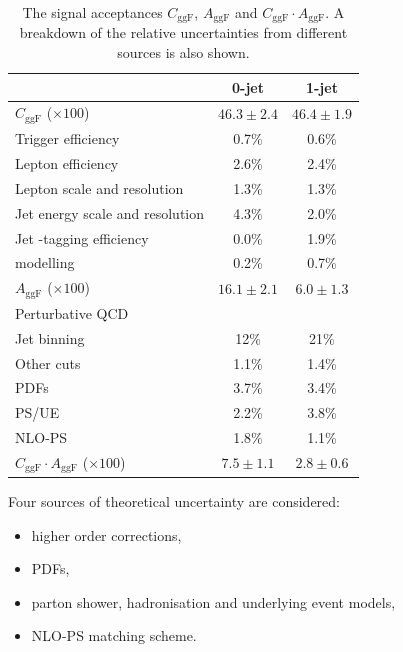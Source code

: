 \begin{table}[t]
	\begin{tabular}{l@{}c@{\hskip 0.2in}c}
		\toprule
		& 0-jet & 1-jet \\
		\midrule
		$C_{\text{ggF}}$ ($\times 100$) & $46.3\pm2.4$ & $46.4\pm1.9$ \\
		\quad Trigger efficiency              & 0.7\% & 0.6\% \\
		\quad Lepton efficiency               & 2.6\% & 2.4\% \\
		\quad Lepton \pt scale and resolution & 1.3\% & 1.3\% \\
		\quad Jet energy scale and resolution & 4.3\% & 2.0\% \\
		\quad Jet \Pbottom-tagging efficiency & 0.0\% & 1.9\% \\
		\quad \met modelling                  & 0.2\% & 0.7\% \\
		\cmidrule(lr){1-3}
		$A_{\text{ggF}}$ ($\times 100$) & $16.1\pm2.1$ & $6.0\pm1.3$ \\
		\quad Perturbative QCD \\
		\quad\quad Jet binning & 12\%  & 21\%  \\
		\quad\quad Other cuts  & 1.1\% & 1.4\% \\
		\quad PDFs             & 3.7\% & 3.4\% \\
		\quad PS/UE            & 2.2\% & 3.8\% \\
		\quad NLO-PS           & 1.8\% & 1.1\% \\
		\cmidrule(lr){1-3}
		$C_{\text{ggF}} \cdot A_{\text{ggF}}$ ($\times 100$) & $7.5\pm1.1$ & $2.8\pm0.6$ \\
		\bottomrule
	\end{tabular}
	\caption{The signal acceptances $C_{\text{ggF}}$, $A_{\text{ggF}}$ and $C_{\text{ggF}} 
	\cdot A_{\text{ggF}}$. A breakdown of the relative uncertainties from different sources 
	is also shown.}
	\label{tab:ggF:cggF_aggF}
\end{table}

\newpage
Four sources of theoretical uncertainty are considered:
\begin{itemize}[noitemsep,nolistsep]
	\item higher order corrections,
	\item PDFs,
	\item parton shower, hadronisation and underlying event models,
	\item NLO-PS matching scheme.
\end{itemize}

